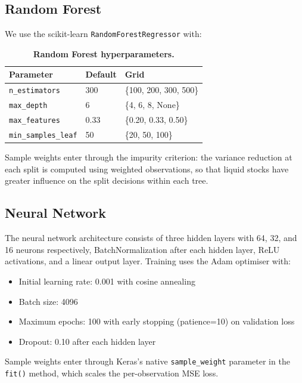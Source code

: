 \subsection{Random Forest}
\label{app:rf}

We use the scikit-learn \texttt{RandomForestRegressor} with:

\begin{table}[h!]
\centering
\begin{tabular}{l l l}
\midrule
Parameter & Default & Grid \\
\midrule
\texttt{n\_estimators} & 300 & \{100, 200, 300, 500\} \\
\texttt{max\_depth} & 6 & \{4, 6, 8, None\} \\
\texttt{max\_features} & 0.33 & \{0.20, 0.33, 0.50\} \\
\texttt{min\_samples\_leaf} & 50 & \{20, 50, 100\} \\
\midrule
\end{tabular}
\caption{\footnotesize \bf Random Forest hyperparameters\normalfont.}
\label{tab:rf_params}
\end{table}

Sample weights enter through the impurity criterion: the variance reduction at each split is computed using weighted observations, so that liquid stocks have greater influence on the split decisions within each tree.

\subsection{Neural Network}
\label{app:nn}

The neural network architecture consists of three hidden layers with 64, 32, and 16 neurons respectively, BatchNormalization after each hidden layer, ReLU activations, and a linear output layer. Training uses the Adam optimiser with:

\begin{itemize}
\item Initial learning rate: 0.001 with cosine annealing
\item Batch size: 4096
\item Maximum epochs: 100 with early stopping (patience=10) on validation loss
\item Dropout: 0.10 after each hidden layer
\end{itemize}

Sample weights enter through Keras's native \texttt{sample\_weight} parameter in the \texttt{fit()} method, which scales the per-observation MSE loss.

